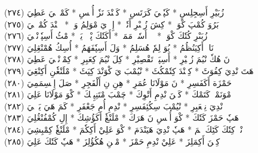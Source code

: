\documentclass[a4paper, 10pt]{report}
\begin{document}
\begin{center}
\textarabic{(٢٧٤) \textcolor{mygreen}{زُبَيْرِ أَسِجِلِسِ  * كَپٗكٖيَ كَرَتَسِ  * كَنٖنْدَ نَزٗ أُپٖسِ  * كَمْپٖكٖيَ عَطِيَ }} 
\\[5mm] 

\textarabic{(٢٧٥) \textcolor{mygreen}{بَرُوَ كُمْپَ كْوَكٖ  * كِشَ زُبٖىْرِ أَتٗكٖ  * إِلٖ يَ مْوَلِمُ وَكٖ  * كٖنٖنْدَ كُمْپٖكٖيَ }} 
\\[5mm] 

\textarabic{(٢٧٦) \textcolor{mygreen}{زُبَىْرِ كُتٗكَ كْوَكٖ  * يٖيٖ أَسٗمٖ مَمَكٖ  * أَكَتٗكَ پْوٖكٖ يَكٖ  * مْٹُ أَسِپٗزٖنْڠٖيَ }} 
\\[5mm] 

\textarabic{(٢٧٧) \textcolor{mygreen}{نَاءٖ أَكِيَنُظُمُ  * يُوَ لِمٗ هُسَلِمُ  * وَلَ أَسِپٗفَهَمُ  * أُسِكُ هُمْنْڠِلِيَ }} 
\\[5mm] 

\textarabic{(٢٧٨) \textcolor{mygreen}{نَ هُكٗ نْيُمَ زُبٖيْرِ  * أَسِپَٹٖ تَقْصِيْرِ  * كِلَ نْيُمَ كِعَبِرِ  * كِمْزٖنْڠٖيَ عَطِيَ }} 
\\[5mm] 

\textarabic{(٢٧٩) \textcolor{mygreen}{هَتَ نْدِيَ كِفُوَٹَ  * كِنٖنْدَ كِتٗمْكُٹَ  * نْيُمْبَ يَ كْوَنْدَ كِپَٹَ  * مْلَنْڠٗنِ أَكِنْڠِيَ }} 
\\[5mm] 

\textarabic{(٢٨٠) \textcolor{mygreen}{حَمْزَة أَكَفَسِرِ  * نَ مَوْلَانَا عُمَرِ  * هِنِ نِ أَلْفَجِرِ  * صَلَ إِمٖسِمَمِيَ }} 
\\[5mm] 

\textarabic{(٢٨١) \textcolor{mygreen}{مْوَنَمْكٖ كَتَمْكَ  * كَنٖنَ نْدِمِ أَتْوِكَ  * چَمْبَ مْتَنِپِلٖكَ  * كْوَ مَوْلَانَا عَلِيَ }} 
\\[5mm] 

\textarabic{(٢٨٢) \textcolor{mygreen}{نْدِيَ نِمٖعَبِرِ  * نْيُمْبَ سِكُئِفَسِرِ  * نْدِمِ أُمِ جَعْفَرِ  * كَمَ هَيَ يَوٖلٖيَ }} 
\\[5mm] 

\textarabic{(٢٨٣) \textcolor{mygreen}{هَپٗ حَمْزَ كَتٗكَ  * كْوَ أُپٖسِ نَ هَرَكَ  * مْلَنْڠٗ أَكَؤُشِكَ  * إِلِ كُمْفُنْڠُلِيَ }} 
\\[5mm] 

\textarabic{(٢٨٤) \textcolor{mygreen}{نْدٖ كِتٗكَ كَٹِكَ هٖمَ  * هَپٗ نْدِيَ هَيَنْدَمَ  * كْوَ عَلِيْ أَكِكٗمَ  * مْلَنْڠٗ كِمْبِشِيَ }} 
\\[5mm] 

\textarabic{(٢٨٥) \textcolor{mygreen}{كِنٖنَ أَكِمَلِزَ  * عَلِيْ نْدِمِ حَمْزَ  * مْڠٖنِ هُكُؤُلِزَ  * هَپٗ كَتٗكَ عَلِيَ }} 
\\[5mm] 


\end{center}
\end{document}
